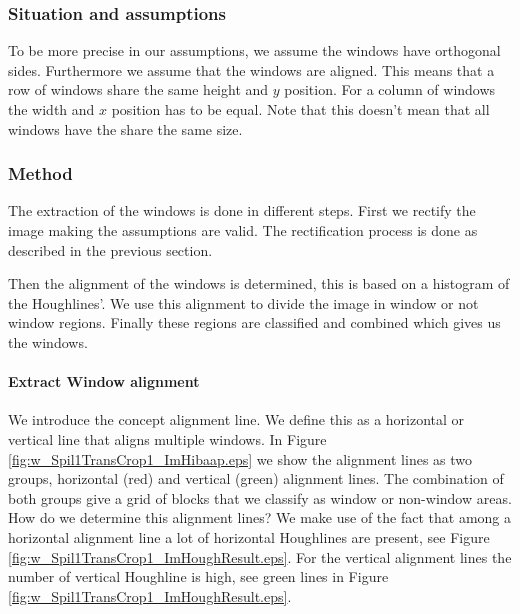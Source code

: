 \subsubsection{Situation and assumptions}
To be more precise in our assumptions, we assume the windows have orthogonal
sides.  Furthermore we assume that the windows are aligned. This means that a
row of windows share the same height and $y$ position. For a column of windows
the width and $x$ position has to be equal.  Note that this doesn't mean that
all windows have the share the same size.

\subsubsection{Method}
The extraction of the windows is done in different steps. First we rectify the 
image making the assumptions are valid. The rectification process is done as
described in the previous section. 

Then the alignment of the windows is determined, this is based on a histogram 
of the Houghlines'. We use this alignment to divide the
image in window or not window regions.  Finally these regions are classified
and combined which gives us the windows.



\paragraph{Extract Window alignment}
We introduce the concept alignment line. We define this as a horizontal or
vertical line that aligns multiple windows. In Figure
\ref{fig:w_Spil1TransCrop1_ImHibaap.eps}
we show the alignment lines as two groups, horizontal (red) and
vertical (green) alignment lines.  The combination of both groups give a grid of
blocks that we classify as window or non-window areas.\\

How do we determine this alignment lines? We make use of the fact that among a
horizontal alignment line a lot of horizontal Houghlines are present, see
Figure \ref{fig:w_Spil1TransCrop1_ImHoughResult.eps}. For the vertical alignment lines
the number of vertical Houghline is high, see green lines in Figure
\ref{fig:w_Spil1TransCrop1_ImHoughResult.eps}.\\

